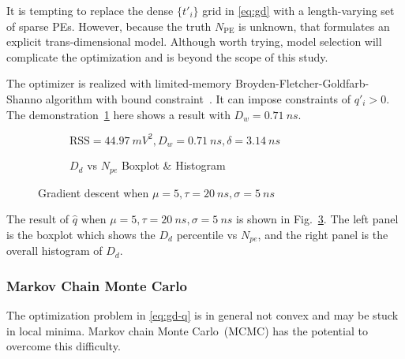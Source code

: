 It is tempting to replace the dense $\{t'_i\}$ grid in \eqref{eq:gd} with a length-varying set of sparse PEs. However, because the truth $N_\mathrm{PE}$ is unknown, that formulates an explicit trans-dimensional model.  Although worth trying, model selection will complicate the optimization and is beyond the scope of this study.

The optimizer is realized with limited-memory Broyden-Fletcher-Goldfarb-Shanno algorithm with bound constraint~\cite{byrd_limited_1995}.  It can impose constraints of $q'_i > 0$. The demonstration~\ref{fig:fitting} here shows a result with $D_w = \SI{0.71}{ns}$.

\begin{figure}[H]
  \begin{subfigure}{.5\textwidth}
    \centering
    \resizebox{\textwidth}{!}{}
    \caption{\label{fig:fitting}$\mathrm{RSS}=\SI{44.97}{mV^2},D_w=\SI{0.71}{ns},\delta=\SI{3.14}{ns}$}
  \end{subfigure}
  \begin{subfigure}{.5\textwidth}
    \centering
    \resizebox{\textwidth}{!}{}
    \caption{\label{fig:fitting-npe} $D_d$ vs $N_{pe}$ Boxplot \& Histogram}
  \end{subfigure}
  \caption{Gradient descent when $\mu=5, \tau=\SI{20}{ns}, \sigma=\SI{5}{ns}$}
\end{figure}

The result of $\hat{q}$ when $\mu=5, \tau=\SI{20}{ns}, \sigma=\SI{5}{ns}$ is shown in Fig.~\ref{fig:fitting-npe}. The left panel is the boxplot which shows the $D_d$ percentile vs $N_{pe}$, and the right panel is the overall histogram of $D_d$. 

\subsubsection{Markov Chain Monte Carlo}
The optimization problem in \eqref{eq:gd-q} is in general not convex and may be stuck in local minima.  Markov chain Monte Carlo~(MCMC) has the potential to overcome this difficulty.

